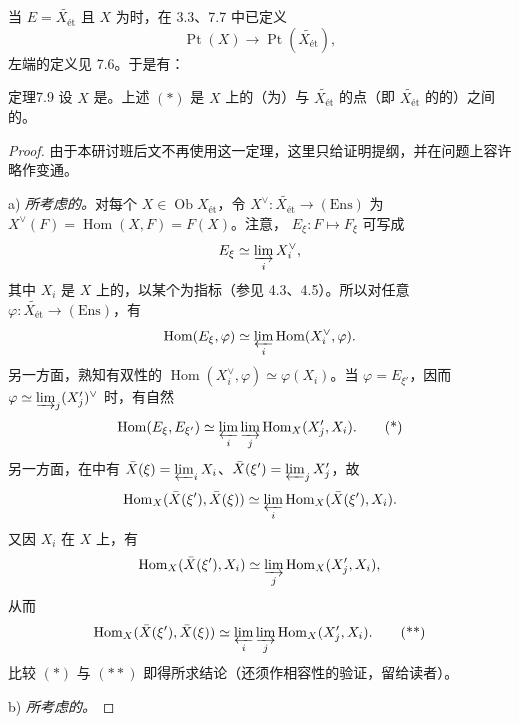 当 $E=\widetilde{X_{\text{ét}}}$ 且 $X$ 为时，在 3.3、7.7 中已定义
\[\operatorname{Pt}(X)\longrightarrow\operatorname{Pt}(\widetilde{X_{\text{ét}}}),\tag{*}\]
左端的定义见 7.6。于是有：
\begin{SGAresult}{定理}{7.9}
设 $X$ 是。上述 $(*)$ 是 $X$ 上的（为）与 $\widetilde{X_{\text{ét}}}$ 的点（即 $\widetilde{X_{\text{ét}}}$ 的的）之间的。
\end{SGAresult}
\begin{proof}
由于本研讨班后文不再使用这一定理，这里只给证明提纲，并在问题上容许略作变通。
\par a) \emph{所考虑的。}对每个 $X\in\operatorname{Ob}X_{\text{ét}}$，令 $X^\vee:\widetilde{X_{\text{ét}}}\to(\mathrm{Ens})$ 为 $X^\vee(F)=\operatorname{Hom}(X,F)=F(X)$。注意， $E_\xi:F\mapsto F_\xi$ 可写成
\[E_\xi\simeq\varinjlim_i X_i^\vee,\]
其中 $X_i$ 是 $X$ 上的，以某个为指标（参见 4.3、4.5）。所以对任意 $\varphi:\widetilde{X_{\text{ét}}}\to(\mathrm{Ens})$，有
\[\operatorname{Hom}(E_\xi,\varphi)\simeq\varprojlim_i\operatorname{Hom}(X_i^\vee,\varphi).\]
另一方面，熟知有双性的 $\operatorname{Hom}(X_i^\vee,\varphi)\simeq\varphi(X_i)$。当 $\varphi=E_{\xi'}$，因而 $\varphi\simeq\varinjlim_j(X'_j)^\vee$ 时，有自然
\[\operatorname{Hom}(E_\xi,E_{\xi'})\simeq\varprojlim_i\varinjlim_j\operatorname{Hom}_X(X'_j,X_i).\tag{*}\]
另一方面，在中有 $\bar X(\xi)=\varprojlim_iX_i$、$\bar X(\xi')=\varprojlim_jX'_j$，故
\[\operatorname{Hom}_X(\bar X(\xi'),\bar X(\xi))\simeq\varprojlim_i\operatorname{Hom}_X(\bar X(\xi'),X_i).\]
又因 $X_i$ 在 $X$ 上，有
\[\operatorname{Hom}_X(\bar X(\xi'),X_i)\simeq\varinjlim_j\operatorname{Hom}_X(X'_j,X_i),\]
从而
\[\operatorname{Hom}_X(\bar X(\xi'),\bar X(\xi))\simeq\varprojlim_i\varinjlim_j\operatorname{Hom}_X(X'_j,X_i).\tag{**}\]
比较 $(*)$ 与 $(**)$ 即得所求结论（还须作相容性的验证，留给读者）。
\par b) \emph{所考虑的。}

\end{proof}
